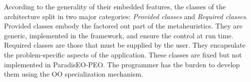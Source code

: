 According to the generality of their embedded features, the classes of the architecture split in two major categories: {\em Provided classes\/} and {\em Required classes\/}. Provided classes embody the factored out part of the metaheuristics. They are generic, implemented in the framework, and ensure the control at run time. Required classes are those that must be supplied by the user. They encapsulate the problem-specific aspects of the application. These classes are fixed but not implemented in Paradis\-EO-PEO. The programmer has the burden to develop them using the OO specialization mechanism. 